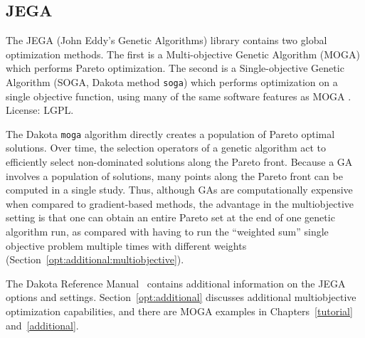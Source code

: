 \subsection{JEGA}\label{opt:software:jega}



The JEGA (John Eddy's Genetic Algorithms) library contains two global
optimization methods. The first is a Multi-objective Genetic Algorithm
(MOGA) which performs Pareto optimization. The second is a
Single-objective Genetic Algorithm (SOGA, Dakota method \texttt{soga})
which performs optimization on a single objective function, using many
of the same software features as MOGA .  License: LGPL.

The Dakota \texttt{moga} algorithm directly creates a population of
Pareto optimal solutions.  Over time, the selection operators of a
genetic algorithm act to efficiently select non-dominated solutions
along the Pareto front.  Because a GA involves a population of
solutions, many points along the Pareto front can be computed in a
single study. Thus, although GAs are computationally expensive when
compared to gradient-based methods, the advantage in the
multiobjective setting is that one can obtain an entire Pareto set at
the end of one genetic algorithm run, as compared with having to run
the ``weighted sum'' single objective problem multiple times with
different weights (Section~\ref{opt:additional:multiobjective}).

The Dakota Reference Manual~\cite{RefMan} contains additional
information on the JEGA options and settings.
Section~\ref{opt:additional} discusses additional multiobjective
optimization capabilities, and there are MOGA examples in
Chapters~\ref{tutorial} and~\ref{additional}.

